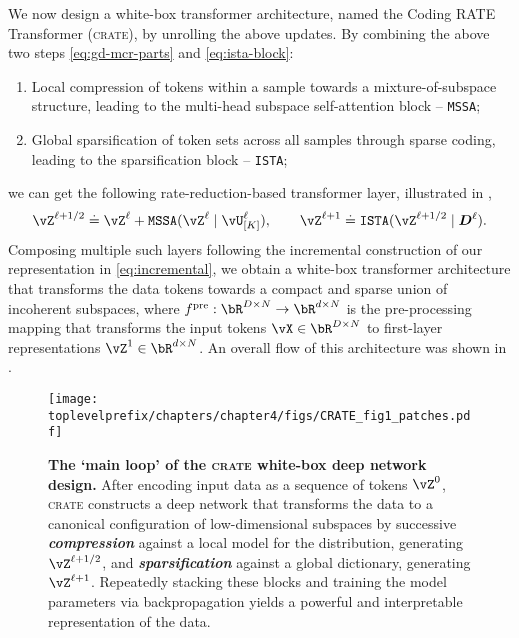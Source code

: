 \documentclass[\toplevelprefix/book-main.tex]{subfiles}
\begin{document}
We now design a white-box transformer architecture, named the Coding RATE Transformer (\textsc{crate}), by unrolling the above updates. By combining the above two steps \eqref{eq:gd-mcr-parts} and \eqref{eq:ista-block}:
\begin{enumerate}[leftmargin=0.7cm]
    \item Local compression of tokens within a sample towards a mixture-of-subspace structure, leading to the multi-head subspace self-attention block -- \texttt{MSSA};
    \item Global sparsification of token sets across all samples through sparse coding, leading to the sparsification block -- \texttt{ISTA};
\end{enumerate}
we can get the following rate-reduction-based transformer layer, illustrated in , 
\begin{equation}
    \vZ^{\ell+1/2} \doteq \vZ^{\ell} + \texttt{MSSA}(\vZ^{\ell} \mid \vU_{[K]}^{\ell}), 
    \qquad 
    \vZ^{\ell+1}\doteq \texttt{ISTA}(\vZ^{\ell+1/2} \mid \bm D^\ell).
\end{equation}
Composing multiple such layers following the incremental construction of our representation in \eqref{eq:incremental}, we obtain a white-box transformer architecture that transforms the data tokens towards a compact and sparse union of incoherent subspaces, where $f^{\pre}: \bR^{D \times N} \rightarrow \bR^{d \times N}$ is the pre-processing mapping that transforms the input tokens $\vX \in \bR^{D \times N}$ to first-layer representations $\vZ^{1} \in \bR^{d \times N}$. An overall flow of this architecture was shown in .

\begin{figure}[t!]
     \centering
         \texttt{[image: \\toplevelprefix/chapters/chapter4/figs/CRATE\_fig1\_patches.pdf]}
     \vspace{-0.1in}
     \caption{
     \textbf{The `main loop' of the \textsc{crate} white-box deep network design.} 
     After encoding input data as a sequence of tokens $\vZ^0$, \textsc{crate} constructs a deep network that transforms the data to a canonical configuration of low-dimensional subspaces by successive   {\textit{\textbf{compression}}} 
     against a local model for the distribution, generating $\vZ^{\ell+1/2}$, and      {\textit{\textbf{sparsification}}} 
     against a global dictionary, generating $\vZ^{\ell+1}$. 
     Repeatedly stacking these blocks and training the model parameters via backpropagation yields a powerful and interpretable representation of the data.
     }
        \label{fig:crate-diagram}
\end{figure}
\end{document}

